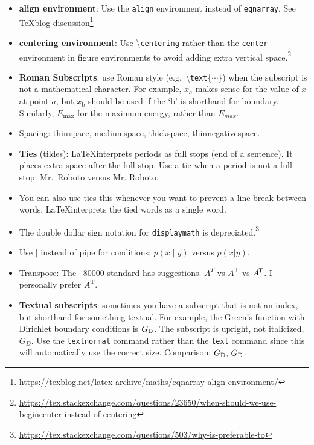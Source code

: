 \begin{itemize}
	\item \textbf{align environment}: Use the \texttt{align} environment instead of \texttt{eqnarray}. See TeXblog discussion\footnote{\url{https://texblog.net/latex-archive/maths/eqnarray-align-environment/}}
	\item \textbf{centering environment}: Use \textbackslash\texttt{centering} rather than the \texttt{center} environment in figure environments to avoid adding extra vertical space.\footnote{\url{https://tex.stackexchange.com/questions/23650/when-should-we-use-begincenter-instead-of-centering}}
	\item \textbf{Roman Subscripts}: use Roman style (e.g.~\textbackslash \texttt{text}\{$\cdots$\}) when the subscript is not a mathematical character. For example, $x_a$ makes sense for the value of $x$ at point $a$, but $x_\text{b}$ should be used if the `b' is shorthand for boundary. Similarly, $E_\text{max}$ for the maximum energy, rather than $E_{max}$.
	\item Spacing: thin\,space, medium\:space, thick\;space, thin\!negative\!space.
	\item \textbf{Ties} (tildes): \LaTeX interprets periods as full stops (end of a sentence). It places extra space after the full stop. Use a tie when a period is not a full stop: Mr.~Roboto versus Mr. Roboto. 
	\item You can also use ties this whenever you want to prevent a line break between words. \LaTeX interprets the tied words as a single word.
	\item The double dollar sign notation for \texttt{displaymath} is depreciated.\footnote{\url{https://tex.stackexchange.com/questions/503/why-is-preferable-to}}
	\item Use $\mid$ instead of pipe for conditions: $p(x\mid y)$ versus $p(x|y)$.
	\item Transpose: The ~80000 standard has suggestions. $A^T$ vs $A^\top$ vs $A^{\trans}$. I personally prefer $A^\text{T}$.
	\item \textbf{Textual subscripts}: sometimes you have a subscript that is not an index, but shorthand for something textual. For example, the Green's function with Dirichlet boundary conditions is $G_\textnormal{D}$. The subscript is upright, not italicized, $G_D$. Use the \texttt{textnormal} command rather than the \texttt{text} command since this will automatically use the correct size. Comparison: $G_\textnormal{D},\,G_\text{D}$.
\end{itemize}

